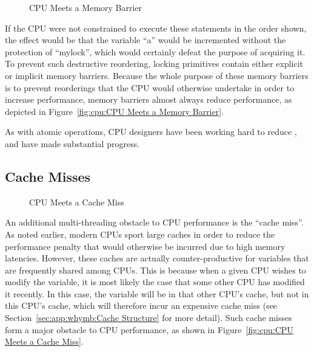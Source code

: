 \begin{figure}
\centering
{}
\caption{CPU Meets a Memory Barrier}
\end{figure}

If the CPU were not constrained to execute these statements in the
order shown, the effect would be that the variable ``a'' would be
incremented without the protection of ``mylock'', which would certainly
defeat the purpose of acquiring it.
To prevent such destructive reordering, locking primitives contain
either explicit or implicit memory barriers.
Because the whole purpose of these memory barriers is to prevent reorderings
that the CPU would otherwise undertake in order to increase performance,
memory barriers almost always reduce performance, as depicted in
Figure~\ref{fig:cpu:CPU Meets a Memory Barrier}.

As with atomic operations, CPU designers have been working hard to
reduce , and have made substantial progress.

\subsection{Cache Misses}
\label{sec:cpu:Cache Misses}

\begin{figure}
\centering
{}
\caption{CPU Meets a Cache Miss}
\end{figure}

An additional multi-threading obstacle to CPU performance is
the ``cache miss''.
As noted earlier, modern CPUs sport large caches in order to reduce the
performance penalty that would otherwise be incurred due to high memory
latencies.
However, these caches are actually counter-productive for variables that
are frequently shared among CPUs.
This is because when a given CPU wishes to modify the variable, it is
most likely the case that some other CPU has modified it recently.
In this case, the variable will be in that other CPU's cache, but not
in this CPU's cache, which will therefore incur an expensive cache miss
(see Section~\ref{sec:app:whymb:Cache Structure} for more detail).
Such cache misses form a major obstacle to CPU performance, as shown
in Figure~\ref{fig:cpu:CPU Meets a Cache Miss}.

